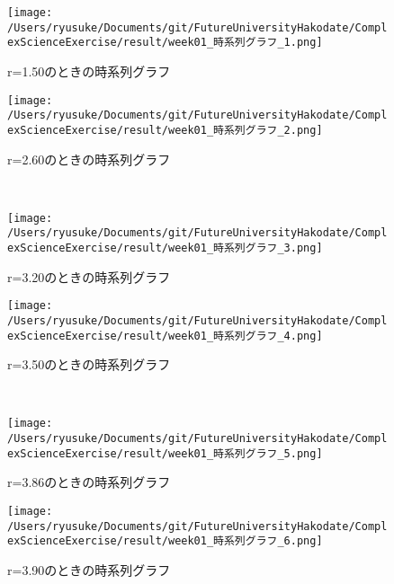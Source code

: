 \documentclass[a4j]{jsarticle}
\begin{document}
\begin{figure}[htbp]
 \begin{minipage}{0.5\hsize}
  \begin{center}
   \texttt{[image: /Users/ryusuke/Documents/git/FutureUniversityHakodate/ComplexScienceExercise/result/week01\_時系列グラフ\_1.png]}
  \end{center}
  \caption{r=1.50のときの時系列グラフ}
  \label{fig:one}
 \end{minipage}
 \begin{minipage}{0.5\hsize}
  \begin{center}
   \texttt{[image: /Users/ryusuke/Documents/git/FutureUniversityHakodate/ComplexScienceExercise/result/week01\_時系列グラフ\_2.png]}
  \end{center}
  \caption{r=2.60のときの時系列グラフ}
  \label{fig:two}
 \end{minipage} \\
 \begin{minipage}{0.5\hsize}
  \begin{center}
   \texttt{[image: /Users/ryusuke/Documents/git/FutureUniversityHakodate/ComplexScienceExercise/result/week01\_時系列グラフ\_3.png]}
  \end{center}
  \caption{r=3.20のときの時系列グラフ}
  \label{fig:three}
 \end{minipage}
 \begin{minipage}{0.5\hsize}
  \begin{center}
   \texttt{[image: /Users/ryusuke/Documents/git/FutureUniversityHakodate/ComplexScienceExercise/result/week01\_時系列グラフ\_4.png]}
  \end{center}
  \caption{r=3.50のときの時系列グラフ}
  \label{fig:four}
 \end{minipage} \\
 \begin{minipage}{0.5\hsize}
  \begin{center}
   \texttt{[image: /Users/ryusuke/Documents/git/FutureUniversityHakodate/ComplexScienceExercise/result/week01\_時系列グラフ\_5.png]}
  \end{center}
  \caption{r=3.86のときの時系列グラフ}
  \label{fig:five}
 \end{minipage}
 \begin{minipage}{0.5\hsize}
  \begin{center}
   \texttt{[image: /Users/ryusuke/Documents/git/FutureUniversityHakodate/ComplexScienceExercise/result/week01\_時系列グラフ\_6.png]}
  \end{center}
  \caption{r=3.90のときの時系列グラフ}
  \label{fig:six}
 \end{minipage}
\end{figure}
\end{document}
